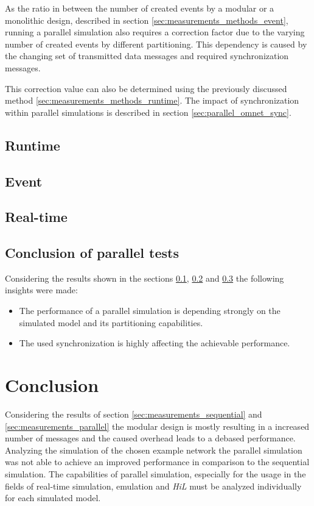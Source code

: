 As the ratio in between the number of created events by a modular or a monolithic design, described in section \ref{sec:measurements_methods_event}, running a parallel simulation also requires a correction factor due to the varying number of created events by different partitioning.
This dependency is caused by the changing set of transmitted data messages and required synchronization messages.

This correction value can also be determined using the previously discussed method \ref{sec:measurements_methods_runtime}.
The impact of synchronization within parallel simulations is described in section \ref{sec:parallel_omnet_sync}.

\subsection{Runtime}
\label{sec:measurements_parallel_runtime}


\subsection{Event}
\label{sec:measurements_parallel_event}


\subsection{Real-time}
\label{sec:measurements_parallel_realtime}

\subsection{Conclusion of parallel tests}

Considering the results shown in the sections \ref{sec:measurements_parallel_runtime}, \ref{sec:measurements_parallel_event} and \ref{sec:measurements_parallel_realtime} the following insights were made:

\begin{itemize}
    \item The performance of a parallel simulation is depending strongly on the simulated model and its partitioning capabilities.
    \item The used synchronization is highly affecting the achievable performance.
\end{itemize}

\section{Conclusion}
Considering the results of section \ref{sec:measurements_sequential} and \ref{sec:measurements_parallel} the modular design is mostly resulting in a increased number of messages and the caused overhead leads to a debased performance.
Analyzing the simulation of the chosen example network the parallel simulation was not able to achieve an improved performance in comparison to the sequential simulation.
The capabilities of parallel simulation, especially for the usage in the fields of real-time simulation, emulation and \emph{HiL} must be analyzed individually for each simulated model. 